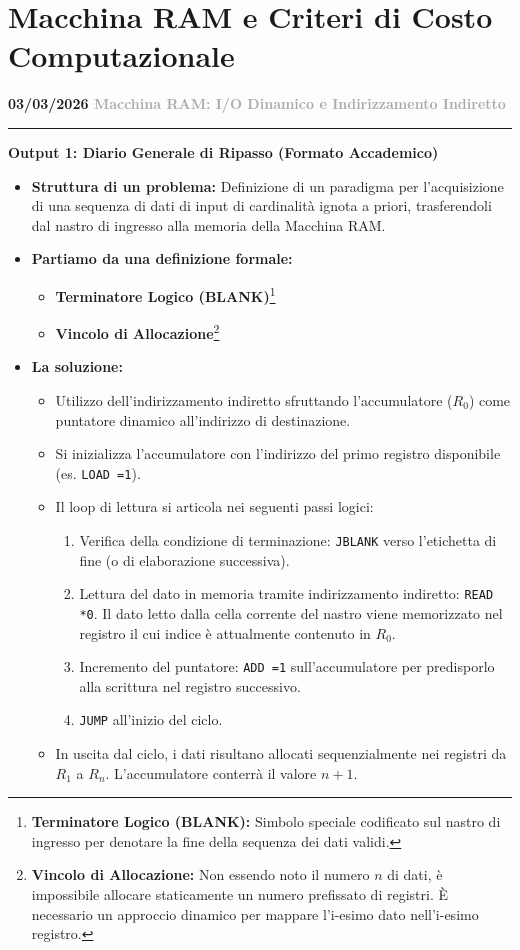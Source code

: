 \documentclass[a4paper, 11pt]{report}
\newcommand{\lezione}[2]{
\vspace{2em}
\noindent\textbf{\Large #1 \hfill \textcolor{darkgray}{#2}}
\vspace{0.5em}
\hrule
\vspace{1.5em}
}
\newcommand{\definizione}[2]{%
\textbf{#1}\footnote{\textbf{#1:} #2}%
}
\begin{document}
\chapter{Macchina RAM e Criteri di Costo Computazionale}

\lezione{03/03/2026}{Macchina RAM: I/O Dinamico e Indirizzamento Indiretto}
\vspace{0.5cm}
\textbf{Output 1: Diario Generale di Ripasso (Formato Accademico)}
\begin{itemize}
\item \textbf{Struttura di un problema:}
Definizione di un paradigma per l'acquisizione di una sequenza di dati di input di cardinalità ignota a priori, trasferendoli dal nastro di ingresso alla memoria della Macchina RAM.

\item \textbf{Partiamo da una definizione formale:}
\begin{itemize}
    \item \definizione{Terminatore Logico (BLANK)}{Simbolo speciale codificato sul nastro di ingresso per denotare la fine della sequenza dei dati validi.}
    \item \definizione{Vincolo di Allocazione}{Non essendo noto il numero $n$ di dati, è impossibile allocare staticamente un numero prefissato di registri. È necessario un approccio dinamico per mappare l'i-esimo dato nell'i-esimo registro.}
\end{itemize}

\item \textbf{La soluzione:}
\begin{itemize}
    \item Utilizzo dell'indirizzamento indiretto sfruttando l'accumulatore ($R_0$) come puntatore dinamico all'indirizzo di destinazione.
    \item Si inizializza l'accumulatore con l'indirizzo del primo registro disponibile (es. \texttt{LOAD =1}).
    \item Il loop di lettura si articola nei seguenti passi logici:
    \begin{enumerate}
        \item Verifica della condizione di terminazione: \texttt{JBLANK} verso l'etichetta di fine (o di elaborazione successiva).
        \item Lettura del dato in memoria tramite indirizzamento indiretto: \texttt{READ *0}. Il dato letto dalla cella corrente del nastro viene memorizzato nel registro il cui indice è attualmente contenuto in $R_0$.
        \item Incremento del puntatore: \texttt{ADD =1} sull'accumulatore per predisporlo alla scrittura nel registro successivo.
        \item \texttt{JUMP} all'inizio del ciclo.
    \end{enumerate}
    \item In uscita dal ciclo, i dati risultano allocati sequenzialmente nei registri da $R_1$ a $R_n$. L'accumulatore conterrà il valore $n+1$.
\end{itemize}
\end{itemize}
\end{document}

